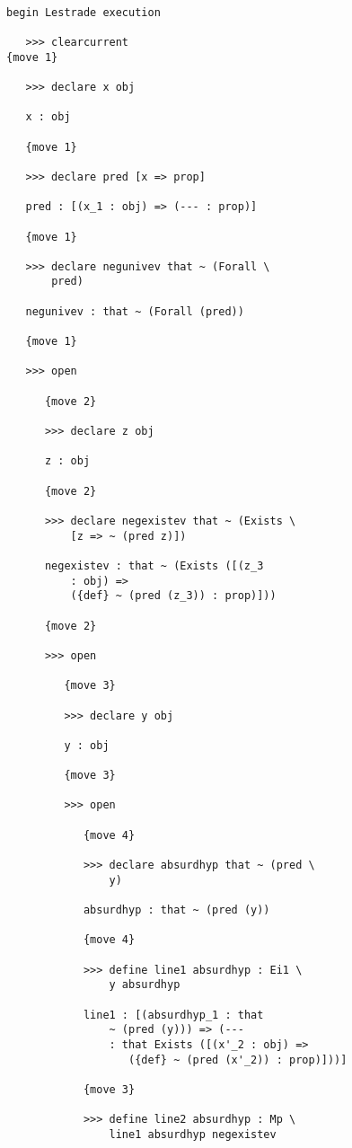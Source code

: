 \documentclass[12pt]{article}
\begin{document}
\begin{verbatim}

begin Lestrade execution

   >>> clearcurrent
{move 1}

   >>> declare x obj

   x : obj

   {move 1}

   >>> declare pred [x => prop]

   pred : [(x_1 : obj) => (--- : prop)]

   {move 1}

   >>> declare negunivev that ~ (Forall \
       pred)

   negunivev : that ~ (Forall (pred))

   {move 1}

   >>> open

      {move 2}

      >>> declare z obj

      z : obj

      {move 2}

      >>> declare negexistev that ~ (Exists \
          [z => ~ (pred z)])

      negexistev : that ~ (Exists ([(z_3 
          : obj) => 
          ({def} ~ (pred (z_3)) : prop)]))

      {move 2}

      >>> open

         {move 3}

         >>> declare y obj

         y : obj

         {move 3}

         >>> open

            {move 4}

            >>> declare absurdhyp that ~ (pred \
                y)

            absurdhyp : that ~ (pred (y))

            {move 4}

            >>> define line1 absurdhyp : Ei1 \
                y absurdhyp

            line1 : [(absurdhyp_1 : that 
                ~ (pred (y))) => (--- 
                : that Exists ([(x'_2 : obj) => 
                   ({def} ~ (pred (x'_2)) : prop)]))]

            {move 3}

            >>> define line2 absurdhyp : Mp \
                line1 absurdhyp negexistev


\end{verbatim}
\end{document}
